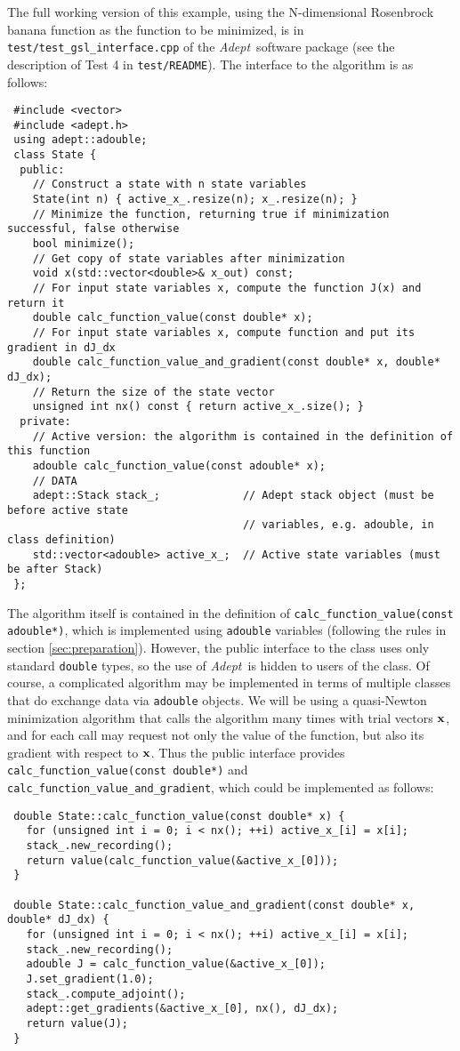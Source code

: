 \documentclass[a4,oneside]{book}
\def\codesize{\small}
\def\x{\ensuremath{{\bf x}}}
\def\Adept{\emph{Adept}}
\def\code#1{{\codesize\texttt{#1}}}
\begin{document}
The full working version of this example, using the N-dimensional
Rosenbrock banana function as the function to be minimized, is in
\code{test/test\_gsl\_interface.cpp} of the \Adept\ software package
(see the description of Test 4 in \code{test/README}). The interface
to the algorithm is as follows:
%
\begin{lstlisting}
 #include <vector>
 #include <adept.h>
 using adept::adouble;
 class State {
  public:
    // Construct a state with n state variables
    State(int n) { active_x_.resize(n); x_.resize(n); }
    // Minimize the function, returning true if minimization successful, false otherwise
    bool minimize();
    // Get copy of state variables after minimization
    void x(std::vector<double>& x_out) const;
    // For input state variables x, compute the function J(x) and return it
    double calc_function_value(const double* x);
    // For input state variables x, compute function and put its gradient in dJ_dx
    double calc_function_value_and_gradient(const double* x, double* dJ_dx);
    // Return the size of the state vector
    unsigned int nx() const { return active_x_.size(); }
  private:
    // Active version: the algorithm is contained in the definition of this function
    adouble calc_function_value(const adouble* x);
    // DATA
    adept::Stack stack_;             // Adept stack object (must be before active state
                                     // variables, e.g. adouble, in class definition)
    std::vector<adouble> active_x_;  // Active state variables (must be after Stack)
 };
\end{lstlisting}
%
The algorithm itself is contained in the definition of
\code{calc\_function\_value(const adouble*)}, which is implemented using
\code{adouble} variables (following the rules in section
\ref{sec:preparation}). However, the public interface to the class
uses only standard \code{double} types, so the use of \Adept\ is
hidden to users of the class.  Of course, a complicated algorithm may
be implemented in terms of multiple classes that do exchange data via
\code{adouble} objects. We will be using a quasi-Newton minimization
algorithm that calls the algorithm many times with trial vectors $\x$,
and for each call may request not only the value of the function, but
also its gradient with respect to $\x$. Thus the public interface
provides \code{calc\_function\_value(const double*)} and
\code{calc\_function\_value\_and\_gradient}, which could be implemented as
follows:
%
\begin{lstlisting}
 double State::calc_function_value(const double* x) {
   for (unsigned int i = 0; i < nx(); ++i) active_x_[i] = x[i];
   stack_.new_recording();
   return value(calc_function_value(&active_x_[0]));
 }

 double State::calc_function_value_and_gradient(const double* x, double* dJ_dx) {
   for (unsigned int i = 0; i < nx(); ++i) active_x_[i] = x[i];
   stack_.new_recording();
   adouble J = calc_function_value(&active_x_[0]);
   J.set_gradient(1.0);
   stack_.compute_adjoint();
   adept::get_gradients(&active_x_[0], nx(), dJ_dx);
   return value(J);
 }
\end{lstlisting}
\end{document}
